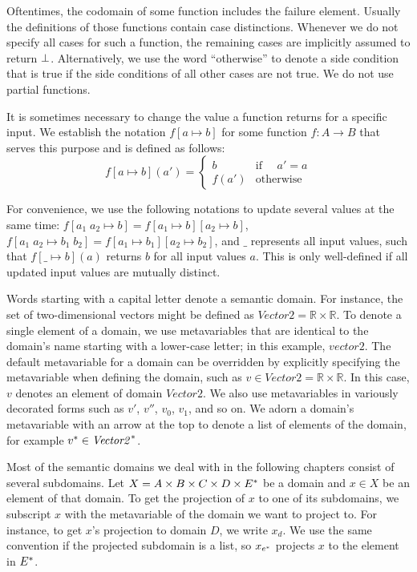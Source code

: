 \documentclass[a4paper,10pt,english]{article}
\begin{document}
	Oftentimes, the codomain of some function includes the failure element. Usually the definitions of those functions contain case distinctions.
	Whenever we do not specify all cases for such a function, the remaining cases are implicitly assumed to return $\bot$.
	Alternatively, we use the word ``otherwise'' to denote a side condition that is true if the side conditions of all other cases are not true. We do not use partial functions.

	It is sometimes necessary to change the value a function returns for a specific input. We establish the notation $f[a \mapsto b]$
	for some function $f \colon A \rightarrow B$ that serves this purpose and is defined as follows:
	\begin{equation*}
	f[a \mapsto b](a') = \begin{cases}
		b & \text{if } \quad a' = a \\
		f(a') & \text{otherwise}
	\end{cases}
	\end{equation*}

	For convenience, we use the following notations to update several values at the same time: 
	$f[a_1 \; a_2 \mapsto b] = f[a_1 \mapsto b][a_2 \mapsto b]$, $f[a_1 \; a_2 \mapsto b_1 \; b_2] = f[a_1 \mapsto b_1][a_2 \mapsto b_2]$, and $\_$ represents all
	input values, such that $f[ \_ \mapsto b](a)$ returns $b$ for all input values $a$.	This is only well-defined if all updated input values are
	mutually distinct.

	Words starting with a capital letter denote a semantic domain. For instance, the set of two-dimensional vectors might be defined as 
	$\mathit{Vector2} = \mathbb{R} \times \mathbb{R}$. To denote a single element of a domain, we use metavariables that are identical to the domain's
	name starting with a lower-case letter; in this example, $\mathit{vector2}$. 
	The default metavariable for a domain can be overridden by explicitly specifying the metavariable 
	when defining the domain, such as $v \in \mathit{Vector2} = \mathbb{R} \times \mathbb{R}$. In this case, $v$ denotes an element of domain $\mathit{Vector2}$.
	We also use metavariables in variously decorated forms such as $v'$, $v''$, $v_0$, $v_1$, and so on. 
	We adorn a domain's metavariable with an arrow at the top to denote a list of elements of the domain, for example
	$v^* \in \mathit{Vector2}^*$.
 
	Most of the semantic domains we deal with in the following chapters consist of several subdomains. 
	Let $X = A \times B \times C \times D \times E^*$ be a domain and $x \in X$ be
	an element of that domain. To get the projection of $x$ to one of its subdomains, we subscript $x$ with the metavariable of the
	domain we want to project to. For instance, to get $x$'s projection to domain $D$, we write $x_d$. We use the same convention if the projected subdomain is
	a list, so $x_{e^*}$ projects $x$ to the element in $E^*$.
	
\end{document}
